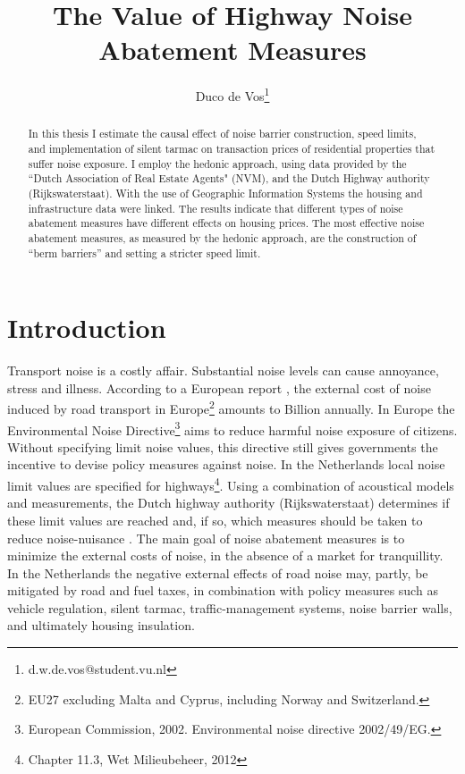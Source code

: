 \documentclass[12pt]{scrartcl}
\title{The Value of Highway Noise Abatement Measures}
\author{Duco de Vos\thanks{d.w.de.vos@student.vu.nl}}
\affil{Vrije Universiteit Amsterdam}
\begin{document}
	
	\maketitle
	
	\begin{abstract}
	
	In this thesis I estimate the causal effect of noise barrier construction, speed limits, and implementation of silent tarmac on transaction prices of residential properties that suffer noise exposure. I employ the hedonic approach, using data provided by the ``Dutch Association of Real Estate Agents" (NVM), and the Dutch Highway authority (Rijkswaterstaat). With the use of Geographic Information Systems the housing and infrastructure data were linked. The results indicate that different types of noise abatement measures have different effects on housing prices. The most effective noise abatement measures, as measured by the hedonic approach, are the construction of ``berm barriers'' and setting a stricter speed limit. 
		
	\end{abstract}
	
	\section{Introduction}
	\label{sec:intro}
	
	Transport noise is a costly affair. Substantial noise levels can cause annoyance, stress and illness. According to a European report \citep{CEDelft2011}, the external cost of noise induced by road transport in Europe\footnote{EU27 excluding Malta and Cyprus, including Norway and Switzerland.} amounts to  Billion annually. In Europe the Environmental Noise Directive\footnote{European Commission, 2002. Environmental noise directive 2002/49/EG.} aims to reduce harmful noise exposure of citizens. Without specifying limit noise values, this directive still gives governments the incentive to devise policy measures against noise. In the Netherlands local noise limit values are specified for highways\footnote{Chapter 11.3, Wet Milieubeheer, 2012}. Using a combination of acoustical models and measurements, the Dutch highway authority (Rijkswaterstaat) determines if these limit values are reached and, if so, which measures should be taken to reduce noise-nuisance \citep{DeVos2015}. The main goal of noise abatement measures is to minimize the external costs of noise, in the absence of a market for tranquillity. In the Netherlands the negative external effects of road noise may, partly, be mitigated by road and fuel taxes, in combination with policy measures such as vehicle regulation, silent tarmac, traffic-management systems, noise barrier walls, and ultimately housing insulation\citep{RIVM2001}. 
	
\end{document}
